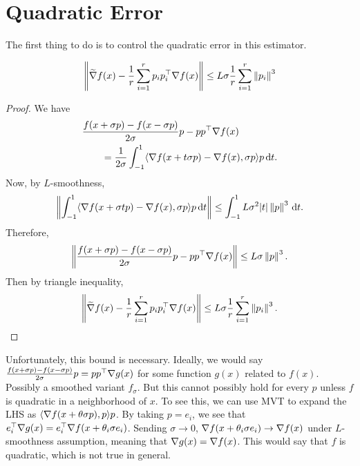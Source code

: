 \section{Quadratic Error}
The first thing to do is to control the quadratic error in this estimator.
\begin{lemma}
    \begin{align*}
        \left\lVert \widetilde{\nabla} f(x) - \frac 1r \sum_{i=1}^r p_ip_i^\top \nabla f(x) \right\rVert \leq L \sigma \frac 1r \sum_{i=1}^r \left\lVert p_i \right\rVert^3
    \end{align*}
\end{lemma}
\begin{proof}
    We have
    \begin{align*}
        &\frac{f(x+\sigma p) - f(x-\sigma p)}{2 \sigma}p - pp^\top \nabla f(x) \\
        &\qquad= \frac{1}{2\sigma}\int_{-1}^1 \langle \nabla f(x+t\sigma p)-\nabla f(x),\sigma p\rangle p\,\dd t.
    \end{align*}
    Now, by $L$-smoothness,
    \begin{align*}
        \left\lVert \int_{-1}^1 \langle \nabla f(x+\sigma t p)-\nabla f(x),\sigma p\rangle p\,\dd t \right\rVert \leq \int_{-1}^1 L\sigma^2|t|\left\lVert p \right\rVert^3\,\dd t.
    \end{align*}
    Therefore,
    \begin{align*}
        \left\lVert \frac{f(x+\sigma p) - f(x-\sigma p)}{2 \sigma}p - pp^\top \nabla f(x) \right\rVert \leq L \sigma \left\lVert p \right\rVert^3.
    \end{align*}
    Then by triangle inequality,
    \begin{align*}
        \left\lVert \widetilde{\nabla} f(x) - \frac 1r \sum_{i=1}^r p_ip_i^\top \nabla f(x) \right\rVert \leq L \sigma \frac 1r \sum_{i=1}^r \left\lVert p_i \right\rVert^3.
    \end{align*}
\end{proof}
Unfortunately, this bound is necessary. Ideally, we would say $\frac{f(x+\sigma p) - f(x-\sigma p)}{2 \sigma} p = pp^\top \nabla g(x)$ for some function $g(x)$ related to $f(x)$. Possibly a smoothed variant $f_\sigma$. But this cannot possibly hold for every $p$ unless $f$ is quadratic in a neighborhood of $x$. To see this, we can use MVT to expand the LHS as $\langle \nabla f(x+\theta \sigma p), p \rangle p$. By taking $p = e_i$, we see that $e_i^\top \nabla g(x) = e_i^\top \nabla f(x+\theta_i \sigma e_i)$. Sending $\sigma \to 0$, $\nabla f(x+\theta_i \sigma e_i) \to \nabla f(x)$ under $L$-smoothness assumption, meaning that $\nabla g(x) = \nabla f(x)$. This would say that $f$ is quadratic, which is not true in general.

